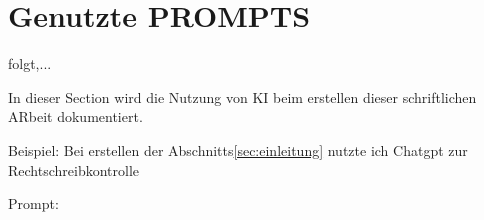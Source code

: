 \section{Genutzte PROMPTS}


folgt,...


In dieser Section wird die Nutzung von KI beim erstellen dieser schriftlichen ARbeit dokumentiert.

Beispiel: Bei erstellen der Abschnitts\ref{sec:einleitung} nutzte ich Chatgpt zur Rechtschreibkontrolle

Prompt: 

